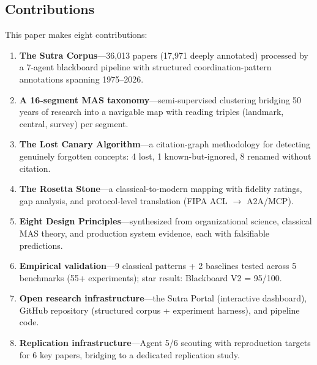\documentclass{article}
\begin{document}
\subsection{Contributions}
\label{sec:intro-contributions}

This paper makes eight contributions:
\begin{enumerate}[nosep, label=\textbf{C\arabic*}:]
  \item \textbf{The Sutra Corpus}---36,013 papers (17,971 deeply annotated) processed by
    a 7-agent blackboard pipeline with structured coordination-pattern annotations
    spanning 1975--2026.
  \item \textbf{A 16-segment MAS taxonomy}---semi-supervised clustering bridging 50 years
    of research into a navigable map with reading triples (landmark, central, survey)
    per segment.
  \item \textbf{The Lost Canary Algorithm}---a citation-graph methodology for detecting
    genuinely forgotten concepts: 4 lost, 1 known-but-ignored, 8 renamed without
    citation.
  \item \textbf{The Rosetta Stone}---a classical-to-modern mapping with fidelity ratings,
    gap analysis, and protocol-level translation (FIPA ACL $\to$ A2A/MCP).
  \item \textbf{Eight Design Principles}---synthesized from organizational science,
    classical MAS theory, and production system evidence, each with falsifiable
    predictions.
  \item \textbf{Empirical validation}---9 classical patterns + 2 baselines tested across
    5 benchmarks (55+ experiments); star result: Blackboard V2 = 95/100.
  \item \textbf{Open research infrastructure}---the Sutra Portal (interactive dashboard),
    GitHub repository (structured corpus + experiment harness), and pipeline code.
  \item \textbf{Replication infrastructure}---Agent 5/6 scouting with reproduction targets
    for 6 key papers, bridging to a dedicated replication study.
\end{enumerate}
\end{document}
